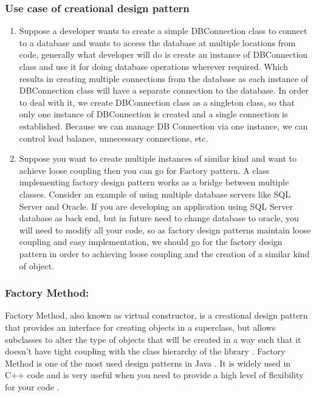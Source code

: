 \documentclass[sigplan,12pt,nonacm=true,review=false]{acmart}
\begin{document}
\subsubsection{Use case of creational design pattern}
\begin{enumerate}
    \item Suppose a developer wants to create a simple DBConnection class to connect to a database and wants to access the database at multiple locations from code, generally what developer will do is create an instance of DBConnection class and use it for doing database operations wherever required. Which results in creating multiple connections from the database as each instance of DBConnection class will have a separate connection to the database. In order to deal with it, we create DBConnection class as a singleton class, so that only one instance of DBConnection is created and a single connection is established. Because we can manage DB Connection via one instance, we can control load balance, unnecessary connections, etc.
    \item Suppose you want to create multiple instances of similar kind and want to achieve loose coupling then you can go for Factory pattern. A class implementing factory design pattern works as a bridge between multiple classes. Consider an example of using multiple database servers like SQL Server and Oracle. If you are developing an application using SQL Server database as back end, but in future need to change database to oracle, you will need to modify all your code, so as factory design patterns maintain loose coupling and easy implementation, we should go for the factory design pattern in order to achieving loose coupling and the creation of a similar kind of object.
\end{enumerate}

\subsubsection{Factory Method: }
Factory Method, also known as virtual constructor, is a creational design pattern that provides an interface for creating objects in a superclass, but allows subclasses to alter the type of objects that will be created \cite{noauthor_factory_nodate} in a way such that it doesn’t have tight coupling with the class hierarchy of the library \cite{noauthor_design_2015-1}. Factory Method is one of the most used design patterns in Java \cite{noauthor_design_nodate-2}. It is widely used in C++ code and is very useful when you need to provide a high level of flexibility for your code \cite{noauthor_design_nodate-3}.
\end{document}
